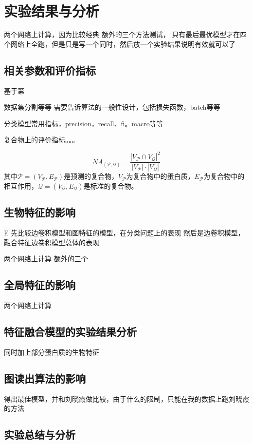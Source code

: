 \chapter{实验结果与分析}
\label{chapter:resultAndOther}
两个网络上计算，因为比较经典
额外的三个方法测试，
只有最后最优模型才在四个网络上全跑，但是只是写一个同时，然后放一个实验结果说明有效就可以了
\section{相关参数和评价指标}
\label{section:metrix}

基于第


数据集分割等等
需要告诉算法的一般性设计，包括损失函数，batch等等

分类模型常用指标，precision，recall、fi。macro等等

复合物上的评价指标。。。


\begin{equation}
    \label{equ:compComplexSim:NA}
    NA_{(\mathcal{P} ,\mathcal{Q} )} = \frac{{\left\lvert V_{\mathcal{P}} \cap V_{\mathcal{Q}}\right\rvert}^2 }{{\left\lvert V_{\mathcal{P}} \right\rvert}\cdot  {\left\lvert V_{\mathcal{Q}} \right\rvert}} 
\end{equation}
其中$\mathcal{P}=(V_{\mathcal{P}} ,E_{\mathcal{P}})$是预测的复合物，$V_{\mathcal{P}}$为复合物中的蛋白质，$E_{\mathcal{P}}$为复合物中的相互作用，$\mathcal{Q}=(V_{\mathcal{Q}} ,E_{\mathcal{Q}})$是标准的复合物。

\section{生物特征的影响}E
\label{section:biofeatAnasys}
先比较边卷积模型和图特征的模型，在分类问题上的表现
然后是边卷积模型，融合特征边卷积模型总体的表现


两个网络上计算
额外的三个
\section{全局特征的影响}
\label{section:globalStructfeatAnasys}
两个网络上计算
\section{特征融合模型的实验结果分析}
\label{section:fusionfeatAnasys}
同时加上部分蛋白质的生物特征

\section{图读出算法的影响}
\label{section:gpoolAnasys}
得出最佳模型，并和刘晓霞做比较，由于什么的限制，只能在我的数据上跑刘晓霞的方法

\section{实验总结与分析}
\label{section:resultSummary}